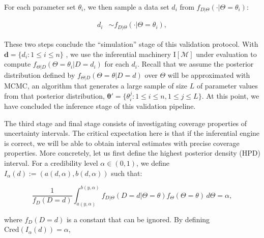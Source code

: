 \documentclass[oneside]{article}
\begin{document}
For each parameter set $\theta_i$, we then sample a data set
$d_i$ from
$f_{D|\Theta}(\cdot|\Theta=\theta_i)$:

\vspace{-1cm}
\begin{align*}
   d_i & \sim  f_{D|\Theta}(\cdot | \Theta=\theta_i),
\end{align*}

These two steps conclude the ``simulation'' stage of this validation protocol.
With
$\boldsymbol{d} = \{d_i: 1 \leq i \leq n\}$
, we use the inferential machinery $\text{I}[\mathcal{M}]$ under
evaluation to compute
$f_{\Theta|D}(\Theta=\theta_i|D=d_i)$ for each $d_i$.
Recall that we assume the posterior distribution defined by $f_{\Theta|D}(\Theta=\theta|D=d)$ over $\Theta$
will be approximated with MCMC, an algorithm that generates a large sample of size $L$ of
parameter values from that posterior distribution, $\boldsymbol{\theta}' =
\{ \theta_i^j: 1 \leq i \leq n, 1 \leq j \leq L\}$.
At this point, we have concluded the inference stage of this validation pipeline.

The third stage and final stage consists of investigating coverage properties of uncertainty intervals.
The critical expectation here is that if the inferential engine is correct, we will be able to obtain interval estimates with precise coverage properties.
More concretely, let us first define the highest posterior density (HPD) interval.
For a credibility level $\alpha \in (0, 1)$, we define $I_\alpha(d) := (a(d, \alpha), b(d, \alpha))$
such that:


\begin{equation*}
  \frac{1}{f_D(D=d)} \int_{a(y, \alpha)}^{b(y,\alpha)} f_{D|\Theta}(D=d | \Theta=\theta)f_\Theta(\Theta=\theta)\, d\Theta = \alpha,
\end{equation*}

\noindent where
$f_D(D=d)$
is a constant that can be ignored.
By defining $\text{Cred}(I_\alpha(d)) = \alpha$,
\end{document}
